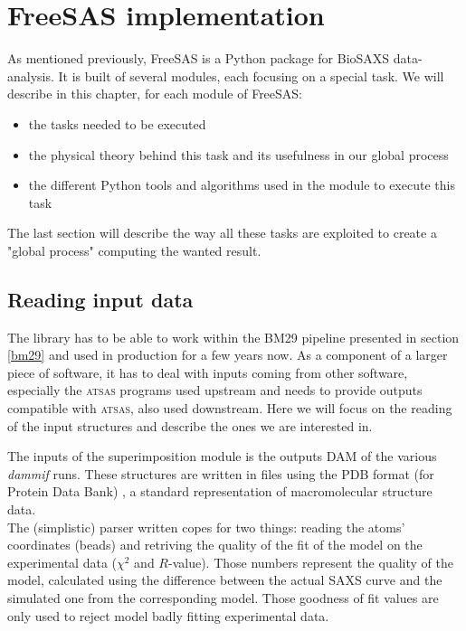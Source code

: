 \documentclass[a4paper, 11pt]{report}
\begin{document}
\chapter{FreeSAS implementation}

As mentioned previously, FreeSAS is a Python package for BioSAXS data-
analysis. 
It is built of several modules, each focusing on a special task. 
We will describe in this chapter, for each module of FreeSAS:
\begin{itemize}
 \item the tasks needed to be executed
 \item the physical theory behind this task and its usefulness in our 
       global process
 \item the different Python tools and algorithms used in the module to 
       execute this task
\end{itemize}
The last section will describe the way all these tasks are exploited 
to create a "global process" computing the wanted result. 

\section{Reading input data}

The library has to be able to work within the BM29 pipeline presented 
in section \ref{bm29} and used in production for a few years  now. 
As a component of a larger piece of software, it has to deal with inputs 
coming from other software, especially the \textsc{atsas} programs used
upstream and needs to provide outputs compatible with \textsc{atsas}, also used
downstream.
Here we will focus on the reading of the input structures and describe the
ones we are interested in.

The inputs of the superimposition module is the
outputs DAM of the various \textit{dammif} runs. 
These structures are written in files using the PDB format (for 
Protein Data Bank) \cite{pdb}, a standard representation of 
macromolecular structure data.\\
The (simplistic) parser written copes for two things: reading the atoms'
coordinates (beads) and retriving the quality of the fit of the model on the
experimental data ($\chi^2$ and $R$-value).
Those numbers represent the quality of the model, calculated using the 
difference between the actual SAXS curve and the simulated one from the
corresponding model. 
Those goodness of fit values are only used to reject model badly fitting
experimental data.
\end{document}
